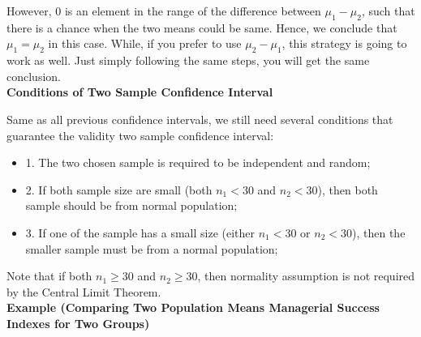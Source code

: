 However, 0 is an element in the range of the difference between $\mu_1 - \mu_2$, such that there is a chance when the two means could be same. Hence, we conclude that $\mu_1 = \mu_2$ in this case. While, if you prefer to use $\mu_2 - \mu_1$, this strategy is going to work as well. Just simply following the same steps, you will get the same conclusion.\\

\textbf{Conditions of Two Sample Confidence Interval}

Same as all previous confidence intervals, we still need several conditions that guarantee the validity two sample confidence interval:

\begin{itemize}
	\item 1. The two chosen sample is required to be independent and random;
	\item 2. If both sample size are small (both $n_1 < 30$ and $n_2 < 30$), then both sample should be from normal population;
	\item 3. If one of the sample has a small size (either $n_1 < 30$ or $n_2 < 30$), then the smaller sample must be from a normal population;
\end{itemize}

Note that if both $n_1 \ge 30$ and $n_2 \ge 30$, then normality assumption is not required by the Central Limit Theorem.\\

\textbf{Example (Comparing Two Population Means Managerial Success Indexes for Two Groups)}

